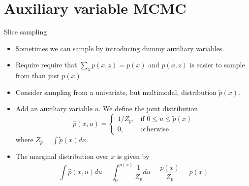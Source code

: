 \documentclass[10pt,mathserif]{beamer}
\begin{document}
\section{Auxiliary variable MCMC}    
\begin{frame}{Slice sampling}
\begin{itemize}
    \item Sometimes we can sample by introducing dummy auxiliary variables.
    \item Require require that $\sum_z p(x, z) = p(x)$ and  $p(x, z)$ is easier to sample from than just $p(x)$.
    \item Consider sampling from a univariate, but multimodal, distribution $\tilde{p}(x)$.
    \item Add an auxiliary variable $u$. We define the joint distribution
    \begin{equation*} 
      \hat{p}(x,u)=\begin{cases}
        1/Z_p, & \text{if } 0 \leq u \leq \tilde{p}(x)\\
        0, & \text{otherwise}
      \end{cases}
    \end{equation*} 
    where $Z_p = \int \tilde{p}(x)dx$. 
    \item The marginal distribution over $x$ is given by
    \begin{equation*} 
        \int \hat{p}(x, u)du = \int_0^{\tilde{p}(x)} \frac{1}{Z_p} du = \frac{\tilde{p}(x)}{Z_p}  = p(x)
    \end{equation*} 
\end{itemize}
\end{frame}
\end{document}
